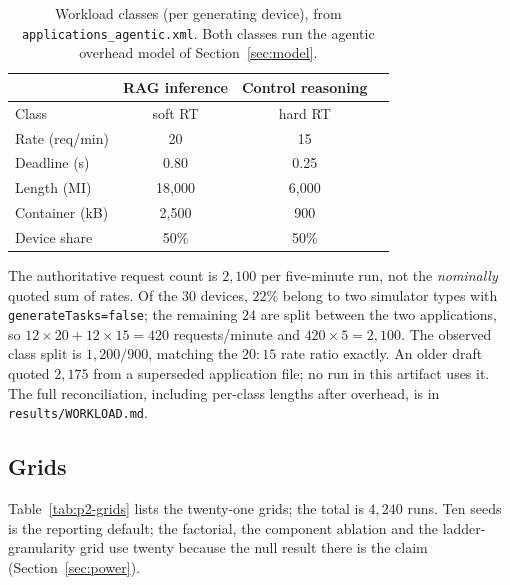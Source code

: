 \documentclass[journal,10pt]{IEEEtran}
\begin{document}
\begin{table}[t]
\centering
\footnotesize
\caption{Workload classes (per generating device), from
\texttt{applications\_agentic.xml}. Both classes run the agentic overhead model
of Section~\ref{sec:model}.}
\label{tab:p2-workload}
\begin{tabular}{@{}lccc@{}}
\toprule
 & RAG inference & Control reasoning\\
\midrule
Class & soft RT & hard RT\\
Rate (req/min) & 20 & 15\\
Deadline (s) & 0.80 & 0.25\\
Length (MI) & 18{,}000 & 6{,}000\\
Container (kB) & 2{,}500 & 900\\
Device share & 50\% & 50\%\\
\bottomrule
\end{tabular}
\end{table}

The authoritative request count is $2{,}100$ per five-minute run, not the \emph{nominally} quoted sum of rates. Of the $30$ devices, $22\%$ belong to two
simulator types with \texttt{generateTasks=false}; the remaining $24$ are split
between the two applications, so $12\times20+12\times15=420$ requests/minute and
$420\times5=2{,}100$. The observed class split is $1{,}200/900$, matching the
$20{:}15$ rate ratio exactly. An older draft quoted $2{,}175$ from a superseded
application file; no run in this artifact uses it. The full reconciliation,
including per-class lengths after overhead, is in
\texttt{results/WORKLOAD.md}.

\subsection{Grids}
Table~\ref{tab:p2-grids} lists the twenty-one grids; the total is $4{,}240$ runs.
Ten seeds is the reporting default; the factorial, the component ablation and the
ladder-granularity grid use twenty because the null result there is the claim
(Section~\ref{sec:power}).
\end{document}
